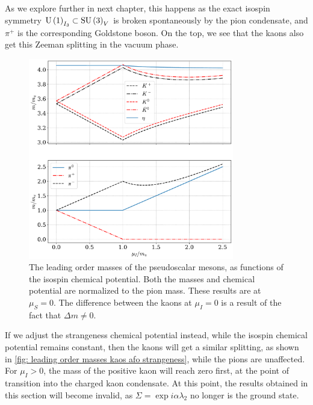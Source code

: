 As we explore further in next chapter, this happens as the exact isospin symmetry $\text{U}\left(1\right)_{I_3} \subset \text{SU}\left(3\right)_V $ is broken spontaneously by the pion condensate, and $\pi^+$ is the corresponding Goldstone boson.
On the top, we see that the kaons also get this Zeeman splitting in the vacuum phase.
%
\begin{figure}
    \centering
    \includegraphics[width=0.8\textwidth]{../scripts/figurer/masses_mesons.pdf}
    \caption{
        The leading order masses of the pseudoscalar mesons, as functions of the isospin chemical potential.
        Both the masses and chemical potential are normalized to the pion mass.
        These results are at $\mu_S = 0$.
        The difference between the kaons at $\mu_I = 0$ is a result of the fact that $\Delta m \neq 0$.
        }
    \label{fig: leading order masses mesons}
\end{figure}
%

If we adjust the strangeness chemical potential instead, while the isospin chemical potential remains constant, then the kaons will get a similar splitting, as shown in \autoref{fig: leading order masses kaos afo strangeness}, while the pions are unaffected.
For $\mu_I > 0$, the mass of the positive kaon will reach zero first, at the point of transition into the charged kaon condensate.
At this point, the results obtained in this section will become invalid, as $\Sigma = \exp{i \alpha \lambda_2}$ no longer is the ground state.


